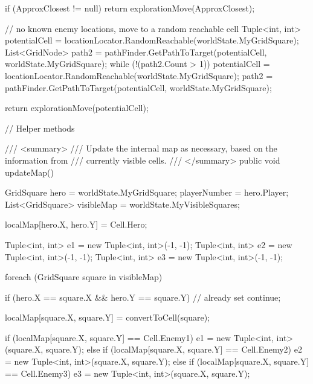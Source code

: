\documentclass[11pt]{article}
\begin{document}
\begin{code}
{{{            if (ApproxClosest != null)
            {
                return explorationMove(ApproxClosest);
            }

            // no known enemy locations, move to a random reachable cell
            Tuple<int, int> potentialCell = locationLocator.RandomReachable(worldState.MyGridSquare);
            List<GridNode> path2 = pathFinder.GetPathToTarget(potentialCell,
                        worldState.MyGridSquare);
            while (!(path2.Count > 1))
            {
                potentialCell = locationLocator.RandomReachable(worldState.MyGridSquare);
                path2 = pathFinder.GetPathToTarget(potentialCell,
                        worldState.MyGridSquare);
            }

            return explorationMove(potentialCell);
        }

        

        // Helper methods

        /// <summary>
        /// Update the internal map as necessary, based on the information from 
        /// currently visible cells.
        /// </summary>
        public void updateMap()
        {
            GridSquare hero = worldState.MyGridSquare;
            playerNumber = hero.Player;
            List<GridSquare> visibleMap = worldState.MyVisibleSquares;

            localMap[hero.X, hero.Y] = Cell.Hero;

            Tuple<int, int> e1 = new Tuple<int, int>(-1, -1);
            Tuple<int, int> e2 = new Tuple<int, int>(-1, -1);
            Tuple<int, int> e3 = new Tuple<int, int>(-1, -1);
            
            foreach (GridSquare square in visibleMap)
            {
                if (hero.X == square.X && hero.Y == square.Y)
                {
                    // already set
                    continue;
                }

               localMap[square.X, square.Y] = convertToCell(square);

               if (localMap[square.X, square.Y] == Cell.Enemy1)
               {
                   e1 = new Tuple<int, int>(square.X, square.Y);
               }
               else if (localMap[square.X, square.Y] == Cell.Enemy2)
               {
                   e2 = new Tuple<int, int>(square.X, square.Y);
               }
               else if (localMap[square.X, square.Y] == Cell.Enemy3)
               {
                   e3 = new Tuple<int, int>(square.X, square.Y);
               }
            }

}}}
\end{code}
\end{document}
